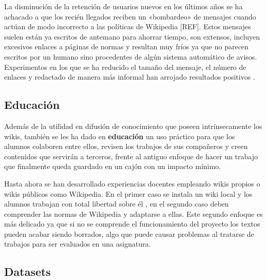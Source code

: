 \documentclass[11pt,onecolumn]{article}
\begin{document}
%

\citep{ford2012}


\citep{zhang2012}


La disminución de la retención de usuarios nuevos en los últimos años se ha achacado a que los recién llegados reciben un «bombardeo» de mensajes cuando actúan de modo incorrecto a las políticas de Wikipedia [REF]. Estos mensajes suelen están ya escritos de antemano para ahorrar tiempo, son extensos, incluyen excesivos enlaces a páginas de normas y resultan muy fríos ya que no parecen escritos por un humano sino procedentes de algún sistema automático de avisos. Experimentos en los que se ha reducido el tamaño del mensaje, el número de enlaces y redactado de manera más informal han arrojado resultados positivos \citep{faulkner2012}.

\subsection{Educación}



Además de la utilidad en difusión de conocimiento que poseen intrínsecamente los wikis, también se les ha dado en \textbf{educación} un uso práctico para que los alumnos colaboren entre ellos, revisen los trabajos de sus compañeros y creen contenidos que servirán a terceros, frente al antiguo enfoque de hacer un trabajo que finalmente queda guardado en un cajón con un impacto mínimo. 


Hasta ahora se han desarrollado experiencias docentes empleando wikis propios o wikis públicos como Wikipedia. En el primer caso se instala un wiki local y los alumnos trabajan con total libertad sobre él \citep{rodriguez2011, palomoile2012, palomorevision2012, palomorusc2012}, en el segundo caso deben comprender las normas de Wikipedia y adaptarse a ellas. Este segundo enfoque es más delicado ya que si no se comprende el funcionamiento del proyecto los textos pueden acabar siendo borrados, algo que puede causar problemas al tratarse de trabajos para ser evaluados en una asignatura.

\subsection{Datasets}
\end{document}
